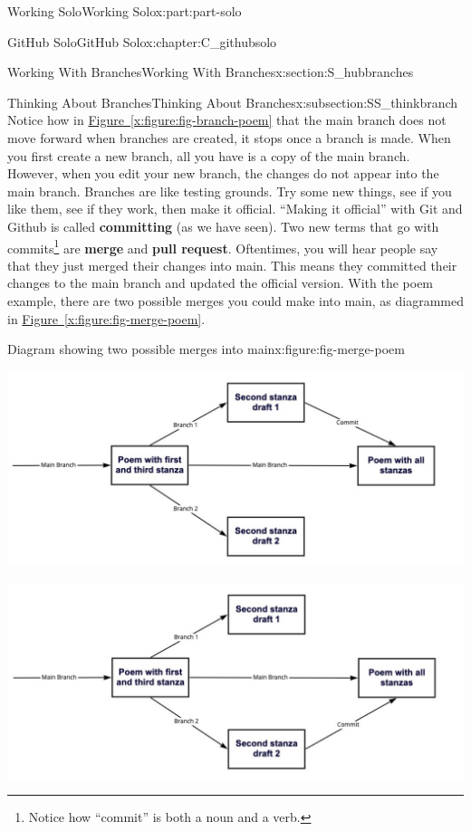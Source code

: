 \documentclass[oneside,10pt,]{book}
\newcommand{\xreffont}{\relax}
\newcommand{\terminology}[1]{\textbf{#1}}
\begin{document}
\begin{partptx}{Working Solo}{}{Working Solo}{}{}{x:part:part-solo}
\begin{chapterptx}{GitHub Solo}{}{GitHub Solo}{}{}{x:chapter:C_githubsolo}
\begin{sectionptx}{Working With Branches}{}{Working With Branches}{}{}{x:section:S_hubbranches}
\begin{subsectionptx}{Thinking About Branches}{}{Thinking About Branches}{}{}{x:subsection:SS_thinkbranch}
 Notice how in \hyperref[x:figure:fig-branch-poem]{Figure~{\xreffont\ref{x:figure:fig-branch-poem}}} that the main branch does not move forward when branches are created, it stops once a branch is made. When you first create a new branch, all you have is a copy of the main branch. However, when you edit your new branch, the changes do not appear into the main branch. Branches are like testing grounds. Try some new things, see if you like them, see if they work, then make it official. ``Making it official'' with Git and Github is called \terminology{committing} (as we have seen). Two new terms that go with commits\footnote{Notice how ``commit'' is both a noun and a verb.\label{g:fn:idp616029832}} are \terminology{merge} and \terminology{pull request}. Oftentimes, you will hear people say that they just merged their changes into main. This means they committed their changes to the main branch and updated the official version. With the poem example, there are two possible merges you could make into main, as diagrammed in \hyperref[x:figure:fig-merge-poem]{Figure~{\xreffont\ref{x:figure:fig-merge-poem}}}.%
\begin{figureptx}{Diagram showing two possible merges into main}{x:figure:fig-merge-poem}{}%
\begin{image}{0.05}{0.9}{0.05}%
\includegraphics[width=\linewidth]{external/merge_poem1.pdf}
\end{image}%
\begin{image}{0.05}{0.9}{0.05}%
\includegraphics[width=\linewidth]{external/merge_poem2.pdf}

\end{image}
\end{figureptx}
\end{subsectionptx}
\end{sectionptx}
\end{chapterptx}
\end{partptx}
\end{document}
